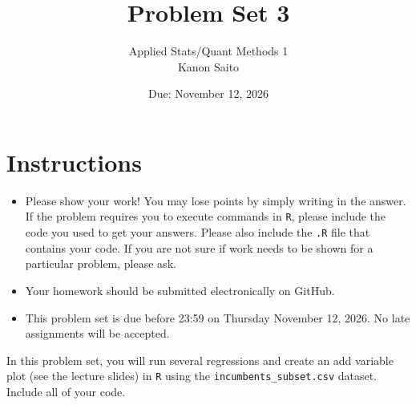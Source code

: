 \documentclass[12pt,letterpaper]{article}
\title{Problem Set 3}
\date{Due: November 12, 2026}
\author{
	Applied Stats/Quant Methods 1\\
	Kanon Saito
}
\begin{document}
	\maketitle
	\section*{Instructions}
	\begin{itemize}
		\item Please show your work! You may lose points by simply writing in the answer. If the problem requires you to execute commands in \texttt{R}, please include the code you used to get your answers. Please also include the \texttt{.R} file that contains your code. If you are not sure if work needs to be shown for a particular problem, please ask.
	\item Your homework should be submitted electronically on GitHub.
	\item This problem set is due before 23:59 on Thursday November 12, 2026. No late assignments will be accepted.

	\end{itemize}

		\vspace{.25cm}
	
\noindent In this problem set, you will run several regressions and create an add variable plot (see the lecture slides) in \texttt{R} using the \texttt{incumbents\_subset.csv} dataset. Include all of your code.

	\vspace{.5cm}
\end{document}
